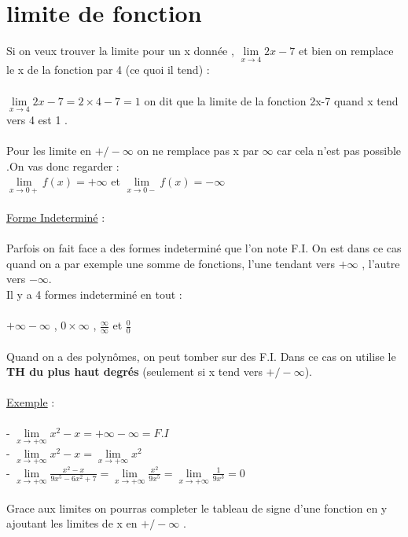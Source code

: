 \documentclass[a4paper,8pt,openany]{book}
\begin{document}
\section{limite de fonction}
Si on veux trouver la limite pour un x donnée , $\lim\limits_{x \rightarrow 4}2x-7$ et bien on remplace le x de la fonction par 4 (ce quoi il tend) :\\
\\
$\lim\limits_{x \rightarrow 4}2x-7 = 2\times4-7=1$ on dit que la limite de la fonction 2x-7 quand x tend vers 4 est 1 .\\
\\
Pour les limite en $+/- \infty$ on ne remplace pas x par $\infty$ car cela n'est pas possible .On vas donc regarder :\\
$\lim\limits_{x \rightarrow 0+} f(x) = +\infty$ et $\lim\limits_{x \rightarrow 0-} f(x) = -\infty$ \\
\\
\underline{Forme Indetermin\'e} : \\
\\
Parfois on fait face a des formes indeterminé que l'on note F.I. On est dans ce cas quand on a par exemple une somme de fonctions, l’une tendant vers $+\infty$ , l’autre vers $-\infty$.\\
Il y a 4 formes indeterminé en tout : \\
\\
$+\infty-\infty$ , $0 \times \infty$ , $\frac{\infty}{\infty}$ et $\frac{0}{0}$\\
\\
Quand on a des polynômes, on peut tomber sur des F.I.
Dans ce cas on utilise le \textbf{TH du plus haut degrés} (seulement si x tend vers $+/-\infty$).\\
\\
\underline{Exemple} : \\
\\
- $\lim\limits_{x \rightarrow +\infty}x^2 -x = +\infty -\infty = F.I $\\
- $\lim\limits_{x \rightarrow +\infty}x^2 -x= \lim\limits_{x \rightarrow +\infty}x^2$\\
- $\lim\limits_{x \rightarrow +\infty}\frac{x^2-x}{9x^5-6x^2+7}= 
\lim\limits_{x \rightarrow +\infty}\frac{x^2}{9x^5}=
\lim\limits_{x \rightarrow +\infty}\frac{1}{9x^3}=0$\\
\\
Grace aux limites on pourras completer le tableau de signe d'une fonction en y ajoutant les limites de x en $+/-\infty$ .\\
\end{document}
